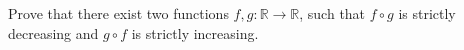 Prove that there exist two functions $f,g : \mathbb{R} \to \mathbb{R}$, such that $f\circ g$ is strictly decreasing and $g\circ f$ is strictly increasing.
